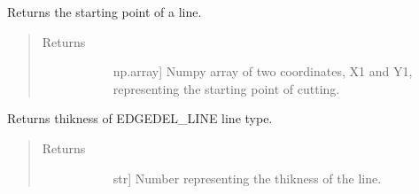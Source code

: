 \documentclass[letterpaper,10pt,english,openany,oneside]{sphinxmanual}
\begin{document}
\begin{fulllineitems}
\begin{fulllineitems}
\begin{quote}
\begin{description}
\begin{description}
\end{description}

\end{description}\end{quote}

\end{fulllineitems}


\begin{fulllineitems}
\label{\detokenize{reference:cnc.optimization.Line.get_starting_point}}
Returns the starting point of a line.
\begin{quote}\begin{description}
\item[{Returns}] \leavevmode\begin{description}
\item[{}] \leavevmode{[}np.array{]}
Numpy array of two coordinates, X1 and Y1, representing the
starting point of cutting.

\end{description}

\end{description}\end{quote}

\end{fulllineitems}


\begin{fulllineitems}
\label{\detokenize{reference:cnc.optimization.Line.get_thikness}}
Returns thikness of EDGEDEL\_LINE line type.
\begin{quote}\begin{description}
\item[{Returns}] \leavevmode\begin{description}
\item[{}] \leavevmode{[}str{]}
Number representing the thikness of the line.

\end{description}

\end{description}\end{quote}


\end{fulllineitems}
\end{fulllineitems}
\end{document}
